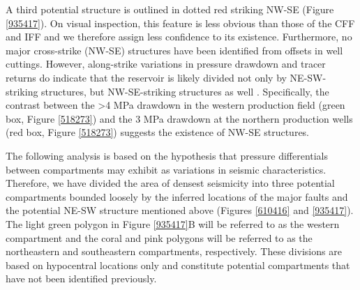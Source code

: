 A third potential structure is outlined in dotted red striking NW-SE (Figure \ref{935417}). On visual inspection, this feature is less obvious than those of the \acrshort{CFF} and \acrshort{IFF} and we therefore assign less confidence to its existence. Furthermore, no major cross-strike (NW-SE) structures have been identified from offsets in well cuttings. However, along-strike variations in pressure drawdown and tracer returns do indicate that the reservoir is likely divided not only by NE-SW-striking structures, but NW-SE-striking structures as well \citep{Sewell_2015,Quinao_2013stanford}. Specifically, the contrast between the \textgreater4 MPa drawdown in the western production field (green box, Figure \ref{518273}) and the 3 MPa drawdown at the northern production wells (red box, Figure \ref{518273}) suggests the existence of NW-SE structures.

The following analysis is based on the hypothesis that pressure differentials between compartments may exhibit as variations in seismic characteristics. Therefore, we have divided the area of densest seismicity into three potential compartments bounded loosely by the inferred locations of the major faults and the potential NE-SW structure mentioned above (Figures \ref{610416} and \ref{935417}). The light green polygon in Figure \ref{935417}B will be referred to as the western compartment and the coral and pink polygons will be referred to as the northeastern and southeastern compartments, respectively. These divisions are based on hypocentral locations only and constitute potential compartments that have not been identified previously.

